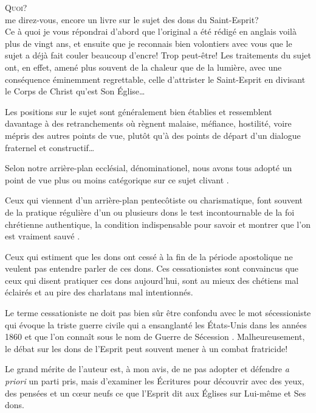 
\begin{preface}

\lettrine[ante=\Og]{Q}{uoi?}\\[1ex]
me direz-vous, encore un livre sur le sujet des dons du Saint-Esprit? \Fg{}\\[1ex]
Ce à quoi je vous répondrai d'abord que l'original a été rédigé en anglais voilà plus de vingt ans, et ensuite que je reconnais bien volontiers avec vous que le sujet a déjà fait couler beaucoup d'encre! Trop peut-être! Les traitements du sujet ont, en effet, amené plus souvent de la \Og chaleur \Fg{} que de la lumière, avec une conséquence éminemment regrettable, celle d'attrister le Saint-Esprit en divisant le Corps de Christ qu'est Son \'Eglise\dots{}

Les positions sur le sujet sont généralement bien établies et ressemblent davantage à des retranchements où règnent malaise, méfiance, hostilité, voire mépris des autres points de vue, plutôt qu'à des points de départ d'un dialogue fraternel et constructif\dots{}

Selon notre arrière-plan ecclésial, dénominationel, nous avons tous adopté un point de vue plus ou moins catégorique sur ce sujet \Og clivant \Fg{}.

Ceux qui viennent d'un arrière-plan pentecôtiste ou charismatique, font souvent de la pratique régulière d'un ou plusieurs dons le test incontournable de la foi chrétienne authentique, la condition indispensable pour savoir et montrer que l'on est \Og vraiment sauvé \Fg{}.

Ceux qui estiment que les dons ont cessé à la fin de la période apostolique ne veulent pas entendre parler de ces dons. Ces \Og cessationistes \Fg{} sont convaincus que ceux qui disent pratiquer ces dons aujourd'hui, sont au mieux des chétiens mal éclairés et au pire des charlatans mal intentionnés.

Le terme \Og cessationiste \Fg{} ne doit pas bien sûr être confondu avec le mot \Og sécessioniste \Fg{} qui évoque la triste guerre civile qui a ensanglanté les \'Etats-Unis dans les années 1860 et que l'on connaît sous le nom de \Og Guerre de Sécession \Fg{}.
 Malheureusement, le débat sur les dons de l'Esprit peut souvent mener à un combat fratricide!

Le grand mérite de l'auteur est, à mon avis, de ne pas adopter et défendre \emph{a priori} un parti pris,
 mais \Og d'examiner les \'Ecritures \Fg{} pour découvrir avec des yeux,
 des pensées et un c\oe{}ur neufs \Og ce que l'Esprit dit aux \'Eglises \Fg{}
 sur Lui-même et Ses dons.


\end{preface}
